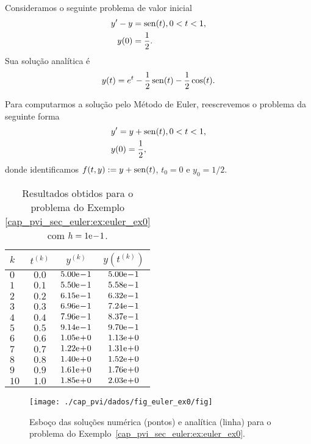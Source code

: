 \begin{ex}\label{cap_pvi_sec_euler:ex:euler_ex0}
  Consideramos o seguinte problema de valor inicial
  \begin{subequations}
    \begin{align}
      y' - y &= \operatorname{sen}(t), 0 < t < 1,\\
      y(0) &= \frac{1}{2}.
    \end{align}
  \end{subequations}
  Sua solução analítica é
  \begin{equation}
    y(t) = e^t - \frac{1}{2}\operatorname{sen}(t) - \frac{1}{2}\cos(t).
  \end{equation}

  Para computarmos a solução pelo Método de Euler, reescrevemos o problema da seguinte forma
  \begin{subequations}
    \begin{align}
      &y' = y + \operatorname{sen}(t), 0 < t < 1,\\
      &y(0) = \frac{1}{2},
    \end{align}
  \end{subequations}
  donde identificamos $f(t,y) := y + \operatorname{sen}(t)$, $t_0=0$ e $y_0=1/2$.

  \begin{table}[H]
    \centering
    \caption{Resultados obtidos para o problema do Exemplo \ref{cap_pvi_sec_euler:ex:euler_ex0} com $h=1\mathrm{e}\!-\!1$.}
    \begin{tabular}{l|cc|c}
      $k$ & $t^{(k)}$ &  $y^{(k)}$ & $y\left(t^{(k)}\right)$ \\\hline
      $0$ & $0.0$ & $5.00\mathrm{e}\!-\!1$ & $5.00\mathrm{e}\!-\!1$\\
      $1$ & $0.1$ & $5.50\mathrm{e}\!-\!1$ & $5.58\mathrm{e}\!-\!1$\\
      $2$ & $0.2$ & $6.15\mathrm{e}\!-\!1$ & $6.32\mathrm{e}\!-\!1$\\
      $3$ & $0.3$ & $6.96\mathrm{e}\!-\!1$ & $7.24\mathrm{e}\!-\!1$\\
      $4$ & $0.4$ & $7.96\mathrm{e}\!-\!1$ & $8.37\mathrm{e}\!-\!1$\\
      $5$ & $0.5$ & $9.14\mathrm{e}\!-\!1$ & $9.70\mathrm{e}\!-\!1$\\
      $6$ & $0.6$ & $1.05\mathrm{e}\!+\!0$ & $1.13\mathrm{e}\!+\!0$\\
      $7$ & $0.7$ & $1.22\mathrm{e}\!+\!0$ & $1.31\mathrm{e}\!+\!0$\\
      $8$ & $0.8$ & $1.40\mathrm{e}\!+\!0$ & $1.52\mathrm{e}\!+\!0$\\
      $9$ & $0.9$ & $1.61\mathrm{e}\!+\!0$ & $1.76\mathrm{e}\!+\!0$\\
      $10$ & $1.0$ & $1.85\mathrm{e}\!+\!0$ & $2.03\mathrm{e}\!+\!0$\\\hline
    \end{tabular}
  \end{table}

\begin{figure}[H]
  \centering
  \texttt{[image: ./cap\_pvi/dados/fig\_euler\_ex0/fig]}
  \caption{Esboço das soluções numérica (pontos) e analítica (linha) para o problema do Exemplo~\ref{cap_pvi_sec_euler:ex:euler_ex0}.}
  \label{fig:ex_Euler_1}
\end{figure}
\end{ex}

